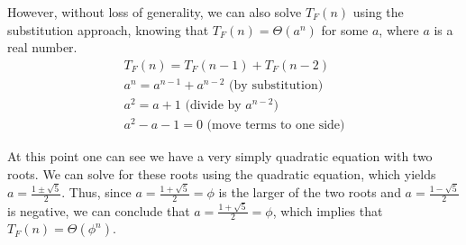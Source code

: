 \documentclass[11pt]{article}
\begin{document}
\begin{sol}
However, without loss of generality, we can also solve $T_{F}(n)$ using the substitution approach, knowing that $T_{F}(n) = \Theta(a^{n})$ for some $a$, where $a$ is a real number.
\begin{eqnarray*}
T_{F}(n) = T_{F}(n-1) + T_{F}(n-2) \\
a^{n} = a^{n-1} + a^{n-2} \text{ (by substitution)}\\
a^{2}  =  a + 1 \text{ (divide by $a^{n-2}$)} \\
a^{2} - a - 1 = 0 \text{ (move terms to one side)}
\end{eqnarray*}

At this point one can see we have a very simply quadratic equation with two roots. We can solve for these roots using the quadratic equation, which yields $a = \frac{1 \pm \sqrt{5}}{2}$. Thus, since $a = \frac{1 + \sqrt{5}}{2} = \phi$ is the larger of the two roots and $a = \frac{1 - \sqrt{5}}{2}$ is negative, we can conclude that $a = \frac{1 + \sqrt{5}}{2} = \phi$, which implies that $T_{F}(n) = \Theta(\phi^{n})$.


\end{sol}
\end{document}
